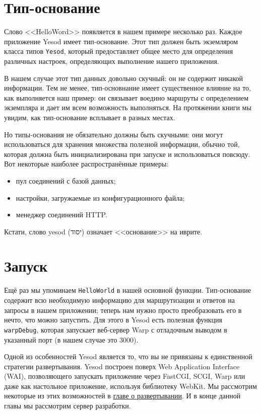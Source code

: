 \section{Тип-основание}

Слово <<HelloWord>> появляется в нашем примере несколько раз. Каждое приложение Yesod
имеет тип-основание. Этот тип должен быть экземляром класса типов \lstinline!Yesod!,
который предоставляет общее место для определения различных настроек, определяющих
выполнение нашего приложения.

В нашем случае этот тип данных довольно скучный: он не содержит никакой информации. Тем не
менее, тип-основнание имеет существенное влияние на то, как выполняется наш пример: он
связывает воедино маршруты с определением экземпляра и дает им всем возможность
выполняться. На протяжении книги мы увидим, как тип-основание всплывает в разных местах.

Но типы-основания не обязательно должны быть скучными: они могут использоваться для
хранения множества полезной информации, обычно той, которая должна быть инициализирована
при запуске и использоваться повсюду. Вот некоторые наиболее распространённые примеры:

\begin{itemize}
  \item пул соединений с базой данных;
  \item настройки, загружаемые из конфигурационного файла;
  \item менеджер соединений HTTP.
\end{itemize}

\begin{remark}
  Кстати, слово yesod (יסוד) означает <<основание>> на иврите.
\end{remark}

\section{Запуск}

Ещё раз мы упоминаем \lstinline!HelloWorld! в нашей основной функции. Тип-основание
содержит всю необходимую информацию для маршрутизации и ответов на запросы в нашем
приложении; теперь нам нужно просто преобразовать его в нечто, что можно запустить. Для
этого в Yesod есть полезная функция \lstinline!warpDebug!, которая запускает веб-сервер
Warp с отладочным выводом в указанный порт (в нашем случае это 3000).

Одной из особенностей Yesod является то, что вы не привязаны к единственной стратегии
развертывания. Yesod построен поверх Web Application Interface (WAI), позволяющего
запускать приложение через FastCGI, SCGI, Warp или даже как настольное приложение,
используя библиотеку WebKit. Мы рассмотрим некоторые из этих возможностей в
\hyperref[ch:deploy]{главе о развертывании}. И в конце данной главы мы рассмотрим сервер
разработки.

